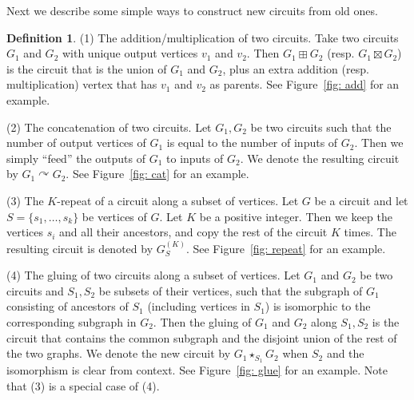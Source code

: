 \documentclass[11pt]{article} %
\theoremstyle{plain}
\theoremstyle{definition}
\newtheorem{definition}{Definition}
\begin{document}
Next we describe some simple ways to construct new circuits from old ones. 
\begin{definition}
(1) The addition/multiplication of two circuits. Take two circuits $G_1$ and $G_2$ with unique output vertices $v_1$ and $v_2$.  Then $G_1 \boxplus G_2$ (resp. $G_1 \boxtimes G_2$) is the circuit that is the union of $G_1$ and $G_2$, plus an extra addition (resp. multiplication) vertex that has $v_1$ and $v_2$ as parents. 
See Figure~\ref{fig: add} for an example. 

(2) The concatenation of two circuits. Let $G_1, G_2$ be two circuits such that the number of output vertices of $G_1$ is equal to the number of inputs of $G_2$. Then we simply ``feed'' the outputs of $G_1$ to inputs of $G_2$. We denote the resulting circuit by 
$G_1 \curvearrowright G_2$. See Figure~\ref{fig: cat} for an example.

(3) The $K$-repeat of a circuit along a subset of vertices. Let $G$ be a circuit and let $S = \{ s_1, \ldots, s_k \}$ be vertices of $G$. 
Let $K$ be a positive integer. Then we keep the vertices $s_i$ and all their ancestors, and copy the rest of the circuit $K$ times. The resulting circuit is denoted by $G^{(K)}_{S}$. See Figure~\ref{fig: repeat} for an example. 

(4) The gluing of two circuits along a subset of vertices. Let $G_1$ and $G_2$ be two circuits and $S_1, S_2$ be subsets of their vertices, such that the subgraph of $G_1$ consisting of ancestors of $S_1$ (including vertices in $S_1$) is isomorphic to the corresponding subgraph in $G_2$. Then the gluing of $G_1$ and $G_2$ along $S_1, S_2$ is the circuit that contains the common subgraph  and the disjoint union of the rest of the two graphs. We denote the new circuit by $G_1 \star_{S_1} G_2$ when $S_2$ and the isomorphism is clear from context. See Figure~\ref{fig: glue} for an example. Note that (3) is a special case of (4). 

\end{definition}
\end{document}
